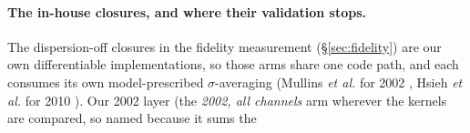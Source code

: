 \paragraph{The in-house closures, and where their validation stops.}
The dispersion-off closures in the fidelity measurement (\S\ref{sec:fidelity}) are our own
differentiable implementations, so those arms share one code path, and each consumes its own
model-prescribed $\sigma$-averaging (Mullins \emph{et al.} for 2002 \cite{mullins2006},
Hsieh \emph{et al.} for 2010 \cite{hsieh2010}). Our 2002 layer (the
\emph{2002, all channels} arm wherever the kernels are compared, so named because it sums the
